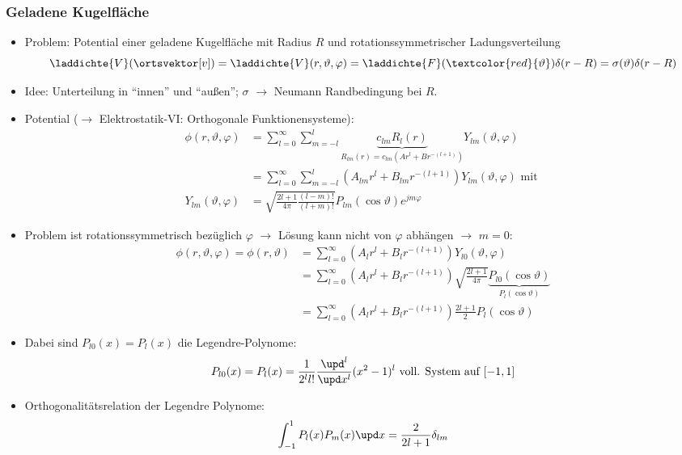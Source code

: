   \begin{frame}
    \frametitle{Geladene Kugelfläche}
\begin{itemize}[<+->]
\item Problem: Potential einer geladene Kugelfläche mit Radius $R$ und \alert{rotationssymmetrischer} Ladungsverteilung
  $$
  \laddichte{V} (\ortsvektor[v]) =\laddichte{V} (r,\vartheta,\varphi) = \laddichte{F} (\textcolor{red}{\vartheta}) \delta(r-R) = \sigma(\vartheta) \delta(r-R) 
  $$
\item Idee: Unterteilung in \enquote{innen} und \enquote{außen}; $\sigma$ $\to$ Neumann Randbedingung bei $R$.
\item Potential ($\to$ Elektrostatik-VI: Orthogonale Funktionensysteme):
\begin{align*}
            \phi(r, \vartheta,\varphi) &= \sum_{l=0}^{\infty}\sum_{m=-l}^l  \underbrace{c_{lm} R_l(r)}_{R_{lm}(r)=c_{lm}(A r^l+ B r^{-(l+1)})} Y_{lm}(\vartheta,\varphi)\\
            &= \sum_{l=0}^{\infty}\sum_{m=-l}^l  (A_{lm} r^l+ B_{lm} r^{-(l+1)}) Y_{lm}(\vartheta,\varphi) \text{ mit } \\Y_{lm}(\vartheta,\varphi)&= \sqrt{\frac{2l+1}{4\pi}\frac{(l-m)!}{(l+m)!}} P_{lm}(\cos\vartheta) e^{jm\varphi}
\end{align*}
\end{itemize}
\end{frame}

\begin{frame}
 \begin{itemize}[<+->]
 \item Problem ist \alert{rotationssymmetrisch} bezüglich $\varphi$ $\to$ Lösung kann nicht von $\varphi$ abhängen $\to$ $m=0$:
   \begin{align*}
     \phi(r, \vartheta,\varphi) = \phi(r, \vartheta) &= \sum_{l=0}^{\infty} (A_{l} r^l+ B_{l} r^{-(l+1)}) Y_{l0}(\vartheta,\varphi)\\
                                                     &= \sum_{l=0}^{\infty} (A_{l} r^l+ B_{l} r^{-(l+1)}) \sqrt{\frac{2l+1}{4\pi}} \underbrace{P_{l0}(\cos\vartheta)}_{P_l (\cos\vartheta)}\\
     & = \sum_{l=0}^{\infty} (A_{l} r^l+ B_{l} r^{-(l+1)}) \frac{2l+1}{2} P_l (\cos\vartheta)
   \end{align*}
 \item Dabei sind $P_{l0}(x) = P_l(x)$ die \alert{Legendre-Polynome}:
   $$
   P_{l0}(x) = P_l(x) = \frac{1}{2^l l!} \frac{\upd^l}{\upd x^l} (x^2-1)^l \text{ voll. System auf } [-1,1]
   $$
 \item Orthogonalitätsrelation der Legendre Polynome:
   $$
   \int_{-1}^1 P_l(x)P_m(x) \upd x = \frac{2}{2l+1} \delta_{lm}
   $$
 \end{itemize}

\end{frame}

